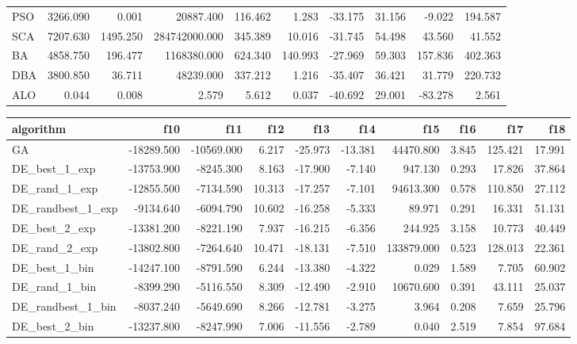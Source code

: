 \documentclass[12pt]{article}
\begin{document}
\begin{table}[H]
\begin{adjustbox}{width=1\textwidth}
\begin{tabular}{lrrrrrrrrr}
    PSO & 3266.090 & 0.001 & 20887.400 & 116.462 & 1.283 & -33.175 & 31.156 & -9.022 & 194.587 \\
    SCA & 7207.630 & 1495.250 & 284742000.000 & 345.389 & 10.016 & -31.745 & 54.498 & 43.560 & 41.552 \\
    BA & 4858.750 & 196.477 & 1168380.000 & 624.340 & 140.993 & -27.969 & 59.303 & 157.836 & 402.363 \\
    DBA & 3800.850 & 36.711 & 48239.000 & 337.212 & 1.216 & -35.407 & 36.421 & 31.779 & 220.732 \\
    ALO & 0.044 & 0.008 & 2.579 & 5.612 & 0.037 & -40.692 & 29.001 & -83.278 & 2.561 \\
    \bottomrule
\end{tabular}
\end{adjustbox}

\begin{adjustbox}{width=1\textwidth}
\begin{tabular}{lrrrrrrrrr}
    \toprule
    algorithm &        f10 &        f11 &    f12 &     f13 &     f14 &          f15 &     f16 &      f17 &     f18 \\
    \midrule
    GA & -18289.500 & -10569.000 & 6.217 & -25.973 & -13.381 & 44470.800 & 3.845 & 125.421 & 17.991 \\
    DE\_best\_1\_exp & -13753.900 & -8245.300 & 8.163 & -17.900 & -7.140 & 947.130 & 0.293 & 17.826 & 37.864 \\
    DE\_rand\_1\_exp & -12855.500 & -7134.590 & 10.313 & -17.257 & -7.101 & 94613.300 & 0.578 & 110.850 & 27.112 \\
    DE\_randbest\_1\_exp & -9134.640 & -6094.790 & 10.602 & -16.258 & -5.333 & 89.971 & 0.291 & 16.331 & 51.131 \\
    DE\_best\_2\_exp & -13381.200 & -8221.190 & 7.937 & -16.215 & -6.356 & 244.925 & 3.158 & 10.773 & 40.449 \\
    DE\_rand\_2\_exp & -13802.800 & -7264.640 & 10.471 & -18.131 & -7.510 & 133879.000 & 0.523 & 128.013 & 22.361 \\
    DE\_best\_1\_bin & -14247.100 & -8791.590 & 6.244 & -13.380 & -4.322 & 0.029 & 1.589 & 7.705 & 60.902 \\
    DE\_rand\_1\_bin & -8399.290 & -5116.550 & 8.309 & -12.490 & -2.910 & 10670.600 & 0.391 & 43.111 & 25.037 \\
    DE\_randbest\_1\_bin & -8037.240 & -5649.690 & 8.266 & -12.781 & -3.275 & 3.964 & 0.208 & 7.659 & 25.796 \\
    DE\_best\_2\_bin & -13237.800 & -8247.990 & 7.006 & -11.556 & -2.789 & 0.040 & 2.519 & 7.854 & 97.684 \\

\end{tabular}
\end{adjustbox}
\end{table}
\end{document}
